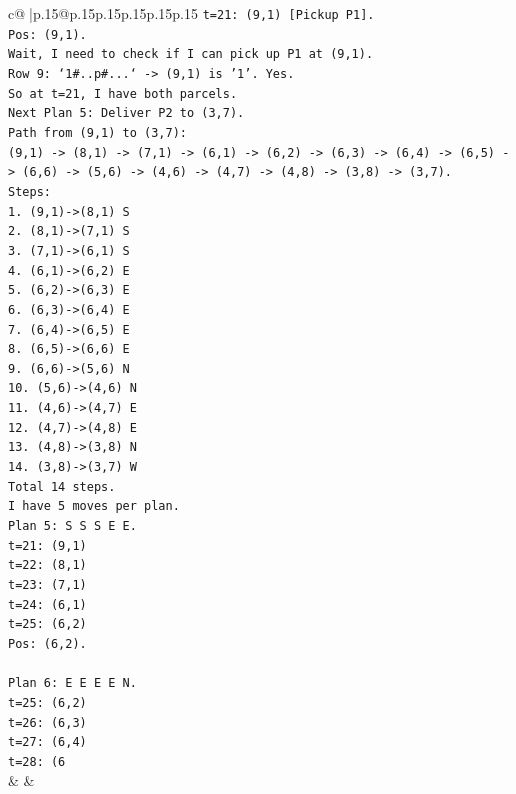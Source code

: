 \documentclass{article}
\begin{document}
{\begin{supertabular}{c@{$\;$}|p{.15\linewidth}@{}p{.15\linewidth}p{.15\linewidth}p{.15\linewidth}p{.15\linewidth}p{.15\linewidth}}
{{{\texttt{t=21: (9,1) {[}Pickup P1{]}.} \\
\texttt{Pos: (9,1).} \\
\texttt{Wait, I need to check if I can pick up P1 at (9,1).} \\
\texttt{Row 9: `1\#..p\#...` {-}> (9,1) is '1'. Yes.} \\
\texttt{So at t=21, I have both parcels.} \\
\texttt{Next Plan 5: Deliver P2 to (3,7).} \\
\texttt{Path from (9,1) to (3,7):} \\
\texttt{(9,1) {-}> (8,1) {-}> (7,1) {-}> (6,1) {-}> (6,2) {-}> (6,3) {-}> (6,4) {-}> (6,5) {-}> (6,6) {-}> (5,6) {-}> (4,6) {-}> (4,7) {-}> (4,8) {-}> (3,8) {-}> (3,7).} \\
\texttt{Steps:} \\
\texttt{1. (9,1){-}>(8,1) S} \\
\texttt{2. (8,1){-}>(7,1) S} \\
\texttt{3. (7,1){-}>(6,1) S} \\
\texttt{4. (6,1){-}>(6,2) E} \\
\texttt{5. (6,2){-}>(6,3) E} \\
\texttt{6. (6,3){-}>(6,4) E} \\
\texttt{7. (6,4){-}>(6,5) E} \\
\texttt{8. (6,5){-}>(6,6) E} \\
\texttt{9. (6,6){-}>(5,6) N} \\
\texttt{10. (5,6){-}>(4,6) N} \\
\texttt{11. (4,6){-}>(4,7) E} \\
\texttt{12. (4,7){-}>(4,8) E} \\
\texttt{13. (4,8){-}>(3,8) N} \\
\texttt{14. (3,8){-}>(3,7) W} \\
\texttt{Total 14 steps.} \\
\texttt{I have 5 moves per plan.} \\
\texttt{Plan 5: S S S E E.} \\
\texttt{t=21: (9,1)} \\
\texttt{t=22: (8,1)} \\
\texttt{t=23: (7,1)} \\
\texttt{t=24: (6,1)} \\
\texttt{t=25: (6,2)} \\
\texttt{Pos: (6,2).} \\
\\ 
\texttt{Plan 6: E E E E N.} \\
\texttt{t=25: (6,2)} \\
\texttt{t=26: (6,3)} \\
\texttt{t=27: (6,4)} \\
\texttt{t=28: (6} \\
            }
        }
    }
    & & \\ \\


\end{supertabular}}
\end{document}
